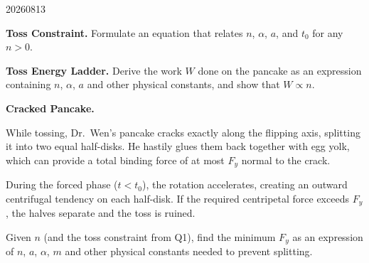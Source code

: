 \begin{problem}{20260813}
\begin{questions}
    \item \textbf{Toss Constraint.}
    Formulate an equation that relates $n$, $\alpha$, $a$, and $t_0$ for any $n > 0$.

    \item \textbf{Toss Energy Ladder.}
    Derive the work $W$ done on the pancake as an expression containing $n$, $\alpha$, $a$ and other physical constants, and show that $W \propto n$.

    \item \textbf{Cracked Pancake.}

    \begin{center}
    \begin{minipage}[c]{0.52\textwidth}
    While tossing, Dr.\ Wen's pancake cracks exactly along the flipping axis, splitting it into two equal half-disks.  He hastily glues them back together with egg yolk, which can provide a total binding force of at most $F_y$ normal to the crack.

    During the forced phase ($t < t_0$), the rotation accelerates, creating an outward centrifugal tendency on each half-disk.  If the required centripetal force exceeds $F_y$, the halves separate and the toss is ruined. 

    Given $n$ (and the toss constraint from Q1), find the minimum $F_y$ as an expression of $n$, $a$, $\alpha$, $m$ and other physical constants needed to prevent splitting.
    \end{minipage}%
    \hfill
    \begin{minipage}[c]{0.42\textwidth}
    \centering
    \end{minipage}
    \end{center}
\end{questions}

\end{problem}

